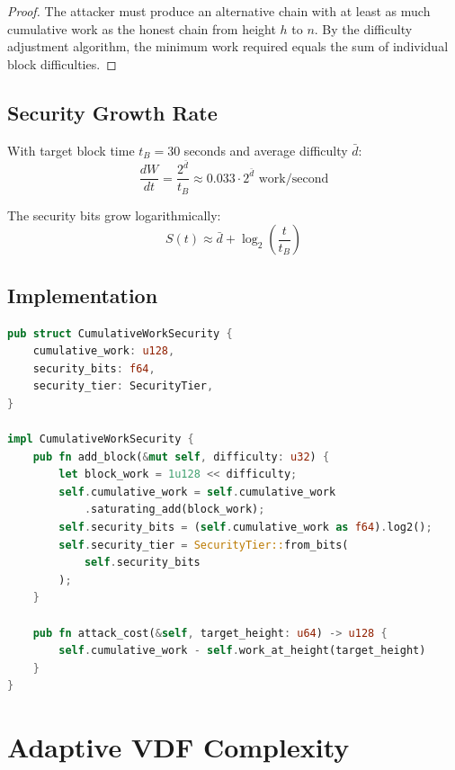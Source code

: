 \documentclass[11pt,a4paper]{article}
\begin{document}
\begin{proof}
The attacker must produce an alternative chain with at least as much cumulative work as the honest chain from height $h$ to $n$. By the difficulty adjustment algorithm, the minimum work required equals the sum of individual block difficulties.
\end{proof}

\subsection{Security Growth Rate}

With target block time $t_B = 30$ seconds and average difficulty $\bar{d}$:
\begin{equation}
    \frac{dW}{dt} = \frac{2^{\bar{d}}}{t_B} \approx 0.033 \cdot 2^{\bar{d}} \text{ work/second}
\end{equation}

The security bits grow logarithmically:
\begin{equation}
    S(t) \approx \bar{d} + \log_2\left(\frac{t}{t_B}\right)
\end{equation}

\subsection{Implementation}

\begin{lstlisting}[language=Rust, caption=Cumulative Work Security Implementation]
pub struct CumulativeWorkSecurity {
    cumulative_work: u128,
    security_bits: f64,
    security_tier: SecurityTier,
}

impl CumulativeWorkSecurity {
    pub fn add_block(&mut self, difficulty: u32) {
        let block_work = 1u128 << difficulty;
        self.cumulative_work = self.cumulative_work
            .saturating_add(block_work);
        self.security_bits = (self.cumulative_work as f64).log2();
        self.security_tier = SecurityTier::from_bits(
            self.security_bits
        );
    }

    pub fn attack_cost(&self, target_height: u64) -> u128 {
        self.cumulative_work - self.work_at_height(target_height)
    }
}
\end{lstlisting}

\section{Adaptive VDF Complexity}
\end{document}

